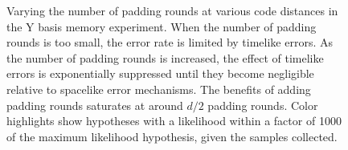 \documentclass[onecolumn,unpublished,a4paper]{quantumarticle}
\theoremstyle{definition}
\theoremstyle{definition}
\theoremstyle{definition}
\begin{document}
\begin{figure}
    \centering
    \caption{
        Varying the number of padding rounds at various code distances in the Y basis memory experiment.
        When the number of padding rounds is too small, the error rate is limited by timelike errors.
        As the number of padding rounds is increased, the effect of timelike errors is exponentially suppressed until they become negligible relative to spacelike error mechanisms.
        The benefits of adding padding rounds saturates at around $d/2$ padding rounds.
        Color highlights show hypotheses with a likelihood within a factor of 1000 of the maximum likelihood hypothesis, given the samples collected.
    }
    \label{fig:pad_saturation}
\end{figure}
\end{document}
